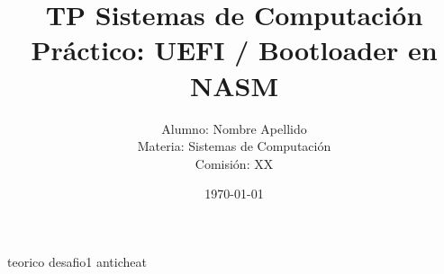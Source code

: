 \documentclass[a4paper,12pt]{article}
\title{\textbf{TP Sistemas de Computación}\\\large Práctico: UEFI / Bootloader en NASM}
\author{Alumno: Nombre Apellido \\ Materia: Sistemas de Computación \\ Comisión: XX}
\date{\today}
\begin{document}


\tableofcontents
\clearpage

 {teorico}
\newpage
 {desafio1}
\newpage
 {anticheat}
\end{document}
